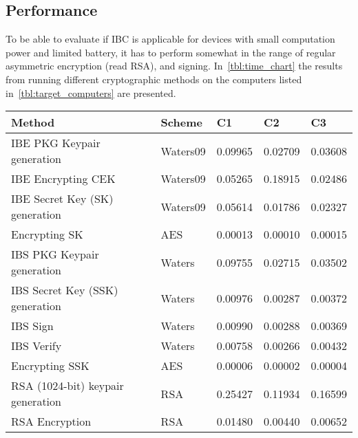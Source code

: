 \subsection{Performance}\label{ibc-performance}
To be able to evaluate if \gls{IBC} is applicable for devices with small computation power and limited battery, it has to perform somewhat in the range of regular asymmetric encryption (read RSA), and signing. 
In~\autoref{tbl:time_chart} the results from running different cryptographic methods on the computers listed in~\autoref{tbl:target_computers} are presented.

\begin{table}[h]
  \begin{tabular}{lllll}
  Method                                      & Scheme          & C1          & C2           & C3              \\ \hline
  IBE PKG Keypair generation                  & Waters09        & 0.09965     & 0.02709      & 0.03608         \\ %
  IBE Encrypting CEK                          & Waters09        & 0.05265     & 0.18915      & 0.02486         \\ %
  IBE Secret Key (SK) generation              & Waters09        & 0.05614     & 0.01786      & 0.02327         \\ %
  Encrypting SK                               & AES             & 0.00013     & 0.00010      & 0.00015         \\ %
  IBS PKG Keypair generation                  & Waters          & 0.09755     & 0.02715      & 0.03502         \\ %
  IBS Secret Key (SSK) generation             & Waters          & 0.00976     & 0.00287      & 0.00372         \\ %
  IBS Sign                                    & Waters          & 0.00990     & 0.00288      & 0.00369         \\ %
  IBS Verify                                  & Waters          & 0.00758     & 0.00266      & 0.00432         \\ %
  Encrypting SSK                              & AES             & 0.00006     & 0.00002      & 0.00004         \\ %
  RSA (1024-bit) keypair generation           & RSA             & 0.25427     & 0.11934      & 0.16599         \\ %
  RSA Encryption                              & RSA             & 0.01480     & 0.00440      & 0.00652         \\ %

\end{tabular}
\end{table}

